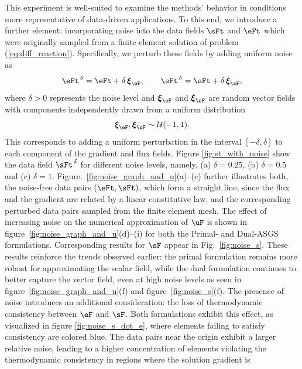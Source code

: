 This experiment is well-suited to examine the methods' behavior in conditions more representative of data-driven applications. To this end, we introduce a further element: incorporating noise into the data fields $\sFt$ and $\eFt$ which were originally sampled from a finite element solution of problem (\ref{eq:diff_reaction}). Specifically, we perturb these fields by adding uniform noise as
\begin{equation}
	\eFt^{\,\delta} = \eFt + \delta\,\boldsymbol{\xi}_{\eF},
	\qquad
	\sFt^{\,\delta} = \sFt + \delta\,\boldsymbol{\xi}_{\sF},
\end{equation}
where $\delta > 0$ represents the noise level and $\boldsymbol{\xi}_{\eF}$ and $\boldsymbol{\xi}_{\sF}$ are random vector fields with components independently drawn from a uniform distribution
\begin{equation}
	\boldsymbol{\xi}_{\eF}, \boldsymbol{\xi}_{\sF} \sim \mathcal{U}(-1,1).
\end{equation}
This corresponds to adding a uniform perturbation in the interval $[-\delta, \delta]$ to each component of the gradient and flux fields. Figure \ref{fig:st_with_noise} show the data field $\sFt^{\,\delta}$ for different noise levels, namely, (a) $\delta=0.25$, (b) $\delta=0.5$ and
(c) $\delta=1$. Figure.~\ref{fig:noise_graph_and_u}(a)--(c) further illustrates
both, the noise-free data pairs $(\eFt,\sFt)$, which form a straight line, since the flux and the gradient are related by a linear constitutive law, and the corresponding perturbed data pairs sampled from the finite element mesh.
The effect of increasing noise on the numerical approximation of $\uF$ is shown in figure~\ref{fig:noise_graph_and_u}(d)–(i) for both the Primal- and Dual-ASGS formulations. Corresponding results for $\sF$ appear in Fig.~\ref{fig:noise_s}. These results reinforce the trends observed earlier: the primal formulation remains more robust for approximating the scalar field, while the dual formulation continues to better capture the vector field, even at high noise levels as seen in figure~\ref{fig:noise_graph_and_u}(f) and figure~\ref{fig:noise_s}(f). 
The presence of noise introduces an additional consideration: the loss of thermodynamic consistency between $\eF$ and $\sF$. Both formulations exhibit this effect, as visualized in figure \ref{fig:noise_s_dot_e}, where elements failing to satisfy consistency are colored blue. 
The data pairs near the origin exhibit a larger relative noise, leading to a higher concentration
of elements violating the thermodynamic consistency in regions where the solution gradient is 
